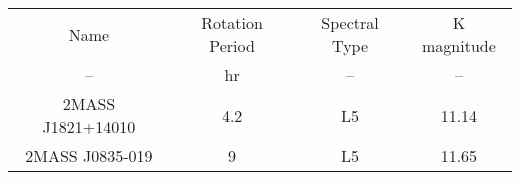 \begin{table*}
\begin{center}
\begin{tabular}{cccc}
Name & Rotation Period & Spectral Type & K magnitude \\
-- & hr & -- & -- \\
2MASS J1821+14010 & 4.2 & L5 & 11.14 \\
2MASS J0835-019 & 9 & L5 & 11.65 \\
\end{tabular}
\end{center}
\end{table*}

